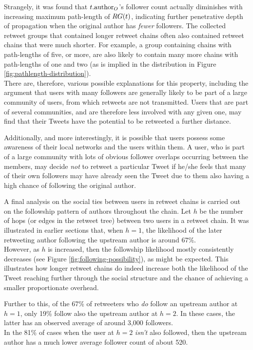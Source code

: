 Strangely, it was found that $t.\textrm{author}_O$'s follower count actually diminishes with increasing maximum path-length of $RG(t)$, indicating further penetrative depth of propagation when the original author has \textit{fewer} followers. The collected retweet groups that contained longer retweet chains often also contained retweet chains that were much shorter. For example, a group containing chains with path-lengths of five, or more, are also likely to contain many more chains with path-lengths of one and two (as is implied in the distribution in Figure \ref{fig:pathlength-distribution}).\\
There are, therefore, various possible explanations for this property, including the argument that users with many followers are generally likely to be part of a large community of users, from which retweets are not transmitted. Users that are part of several communities, and are therefore less involved with any given one, may find that their Tweets have the potential to be retweeted a further distance.

Additionally, and more interestingly, it is possible that users possess some awareness of their local networks and the users within them. A user, who is part of a large community with lots of obvious follower overlaps occurring between the members, may decide \textit{not} to retweet a particular Tweet if he/she feels that many of their own followers may have already seen the Tweet due to them also having a high chance of following the original author.

A final analysis on the social ties between users in retweet chains is carried out on the followship pattern of authors throughout the chain. Let $h$ be the number of hops (or edges in the retweet tree) between two users in a retweet chain. It was illustrated in earlier sections that, when $h = 1$, the likelihood of the later retweeting author following the upstream author is around 67\%.\\
However, as $h$ is increased, then the followship likelihood mostly consistently decreases (see Figure \ref{fig:following-possibility}), as might be expected. This illustrates how longer retweet chains do indeed increase both the likelihood of the Tweet reaching further through the social structure and the chance of achieving a smaller proportionate overhead.

Further to this, of the 67\% of retweeters who \textit{do} follow an upstream author at $h = 1$, only 19\% follow also the upstream author at $h = 2$. In these cases, the latter has an observed average of around 3,000 followers.\\
In the 81\% of cases when the user at $h = 2$ \textit{isn't} also followed, then the upstream author has a much lower average follower count of about 520.

